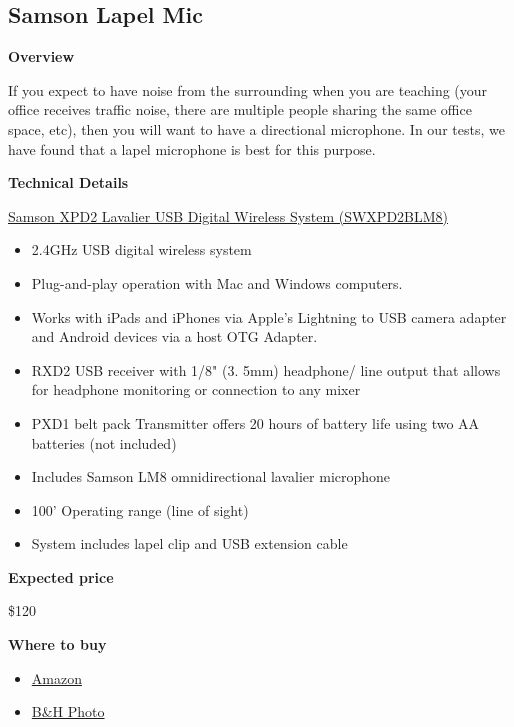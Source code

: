 \subsection{Samson Lapel Mic}

\begin{gram}

\textbf{Overview}

If you expect to have noise from the surrounding when you are teaching
(your office receives traffic noise, there are multiple people sharing
the same office space, etc), then you will want to have a
directional microphone.  
%
In our tests, we have found that a lapel microphone is best for this purpose.
%


\textbf{Technical Details}

\href{http://www.samsontech.com/samson/products/wireless-systems/xpd-series/xpd2lav/}
{Samson XPD2 Lavalier USB Digital Wireless System (SWXPD2BLM8)}

\begin{itemize}
\item 2.4GHz USB digital wireless system
\item Plug-and-play operation with Mac and Windows computers. 
\item Works with iPads and iPhones via Apple's Lightning to USB camera adapter and Android devices via a host OTG Adapter.

\item RXD2 USB receiver with 1/8" (3. 5mm) headphone/ line output that allows for headphone monitoring or connection to any mixer
\item PXD1 belt pack Transmitter offers 20 hours of battery life using two AA batteries (not included)
\item Includes Samson LM8 omnidirectional lavalier microphone
\item 100' Operating range (line of sight)
\item System includes lapel clip and USB extension cable
\end{itemize}

\textbf{Expected price}

\$120

\textbf{Where to buy}

\begin{itemize}

\item \href{https://www.amazon.com/Samson-Wireless-Microphone-System-SWXPD2BLM8/dp/B07HPRZBKC/ref=sr_1_6?crid=3V47B7B3X9SJ5&keywords=wireless+usb+lapel+microphone&qid=1582899680&sprefix=Wireless+USB+lapel+,aps,143&sr=8-6}{Amazon}

\item 
\href{https://www.bhphotovideo.com/c/product/1440151-REG/samson_swxpd2blm8_xpd2_lavalier_usb_wireless.html/?ap=y&ap=y&smp=y&smp=y&lsft=BI%3A514&gclid=EAIaIQobChMIiIOHy-_06QIVUopaBR150wxWEAQYASABEgJL5vD_BwE}{B\&H Photo}
\end{itemize}
\end{gram}

